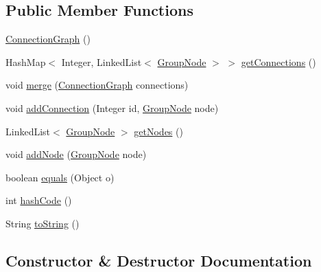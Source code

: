\subsection*{Public Member Functions}
\begin{DoxyCompactItemize}
\item 
\hyperlink{classstructure_1_1_connection_graph_a1af2e60866156900889b166760fe0a78}{Connection\+Graph} ()
\item 
Hash\+Map$<$ Integer, Linked\+List$<$ \hyperlink{classstructure_1_1_group_node}{Group\+Node} $>$ $>$ \hyperlink{classstructure_1_1_connection_graph_ac09bdf474306cbfb1aee7404c7d74e80}{get\+Connections} ()
\item 
void \hyperlink{classstructure_1_1_connection_graph_a96375503c72465740c4919c207619744}{merge} (\hyperlink{classstructure_1_1_connection_graph}{Connection\+Graph} connections)
\item 
void \hyperlink{classstructure_1_1_connection_graph_afc71ae9bd27880a4854fa69d8cbbebc3}{add\+Connection} (Integer id, \hyperlink{classstructure_1_1_group_node}{Group\+Node} node)
\item 
Linked\+List$<$ \hyperlink{classstructure_1_1_group_node}{Group\+Node} $>$ \hyperlink{classstructure_1_1_connection_graph_a6f2466c51efe95a9422e667631af59e8}{get\+Nodes} ()
\item 
void \hyperlink{classstructure_1_1_connection_graph_aab26e85cf3048c1682a6552624d5436c}{add\+Node} (\hyperlink{classstructure_1_1_group_node}{Group\+Node} node)
\item 
boolean \hyperlink{classstructure_1_1_connection_graph_ad86b7fa7e8a3e7206c6ca7b4aee96536}{equals} (Object o)
\item 
int \hyperlink{classstructure_1_1_connection_graph_af352a3e79444b178fc8edef545086836}{hash\+Code} ()
\item 
String \hyperlink{classstructure_1_1_connection_graph_afa0d01d543f0f89f713a3825cf14521e}{to\+String} ()
\end{DoxyCompactItemize}


\subsection{Constructor \& Destructor Documentation}
\mbox{\label{classstructure_1_1_connection_graph_a1af2e60866156900889b166760fe0a78}} 
